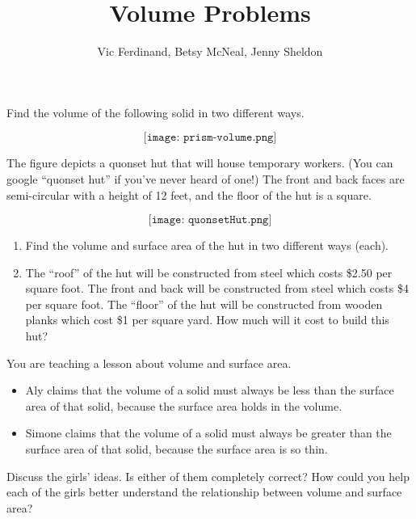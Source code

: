 \documentclass[nooutcomes]{ximera}
\title{Volume Problems}
\author{Vic Ferdinand, Betsy McNeal, Jenny Sheldon}
\begin{document}
\begin{abstract}
\end{abstract}

\maketitle



\begin{problem}
Find the volume of the following solid in two different ways.

\[
\texttt{[image: prism-volume.png]}
\]
\end{problem}

\begin{problem}
The figure depicts a quonset hut that will house temporary workers.  (You can google ``quonset hut'' if you've never heard of one!)  The front and back faces are semi-circular with a height of 12 feet, and the floor of the hut is a square.

\[
\texttt{[image: quonsetHut.png]}
\]

\begin{enumerate}
    \item Find the volume and surface area of the hut in two different ways (each).
    \item The ``roof'' of the hut will be constructed from steel which costs \$2.50 per square foot. The front and back will be constructed from steel which costs \$4 per square foot.  The ``floor'' of the hut will be constructed from wooden planks which cost \$1 per square yard. How much will it cost to build this hut?
\end{enumerate}
\end{problem}

\newpage
\begin{problem}
You are teaching a lesson about volume and surface area.
    \begin{itemize}
        \item Aly claims that the volume of a solid must always be less than the surface area of that solid, because the surface area holds in the volume.
        \item Simone claims that the volume of a solid must always be greater than the surface area of that solid, because the surface area is so thin.
    \end{itemize}
    Discuss the girls' ideas.  Is either of them completely correct?  How could you help each of the girls better understand the relationship between volume and surface area?
\end{problem}
\end{document}
